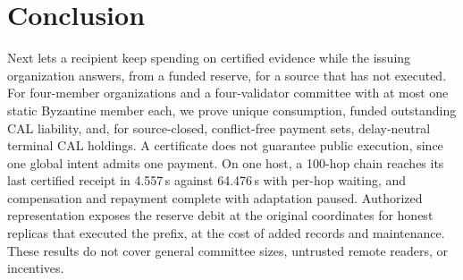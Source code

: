 \section{Conclusion}
\label{sec:conclusion}

Next lets a recipient keep spending on certified evidence while the issuing organization answers, from a funded reserve, for a source that has not executed. For four-member organizations and a four-validator committee with at most one static Byzantine member each, we prove unique consumption, funded outstanding CAL liability, and, for source-closed, conflict-free payment sets, delay-neutral terminal CAL holdings. A certificate does not guarantee public execution, since one global intent admits one payment. On one host, a 100-hop chain reaches its last certified receipt in 4.557\,s against 64.476\,s with per-hop waiting, and compensation and repayment complete with adaptation paused. Authorized representation exposes the reserve debit at the original coordinates for honest replicas that executed the prefix, at the cost of added records and maintenance. These results do not cover general committee sizes, untrusted remote readers, or incentives.